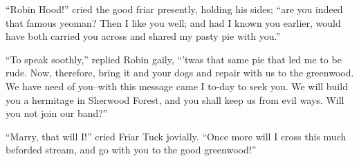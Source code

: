 ``Robin Hood!'' cried the good friar presently, holding his sides; ``are
you indeed that famous yeoman? Then I like you well; and had I known you
earlier, would have both carried you across and shared my pasty pie with
you.''

``To speak soothly,'' replied Robin gaily, ``'twas that same pie that
led me to be rude. Now, therefore, bring it and your dogs and repair
with us to the greenwood. We have need of you--with this message came I
to-day to seek you. We will build you a hermitage in Sherwood Forest,
and you shall keep us from evil ways. Will you not join our band?''

``Marry, that will I!'' cried Friar Tuck jovially. ``Once more will I
cross this much beforded stream, and go with you to the good
greenwood!''
